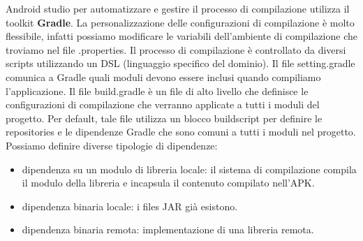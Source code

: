 Android studio per automatizzare e gestire il processo di compilazione utilizza il toolkit \textbf{Gradle}. La personalizzazione delle configurazioni di compilazione è molto flessibile, infatti possiamo modificare le variabili dell'ambiente di compilazione che troviamo nel file .properties. Il processo di compilazione è controllato da diversi scripts utilizzando un DSL (linguaggio specifico del dominio). Il file setting.gradle comunica a Gradle quali moduli devono essere inclusi quando compiliamo l'applicazione. Il file build.gradle è un file di alto livello che definisce le configurazioni di compilazione che verranno applicate a tutti i moduli del progetto. Per default, tale file utilizza un blocco buildscript per definire le repositories e le dipendenze Gradle che sono comuni a tutti i moduli nel progetto. Possiamo definire diverse tipologie di dipendenze:
\begin{itemize}
    \item dipendenza su un modulo di libreria locale: il sistema di compilazione compila il modulo della libreria e incapsula il contenuto compilato nell'APK.
    \item dipendenza binaria locale: i files JAR già esistono.
    \item dipendenza binaria remota: implementazione di una libreria remota.
\end{itemize}
